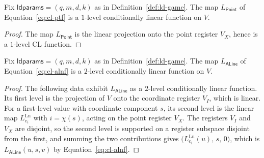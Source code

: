 \begin{lemma}\label{lem:ld-point-level}
	\leanok
	Fix $\mathsf{ldparams} = (q,m,d,k)$ as in Definition~\ref{def:ld-game}. The map $L_{\mathsf{Point}}$ of Equation~\eqref{eq:cl-ptf} is a $1$-level conditionally linear function on $V$.
\end{lemma}
\begin{proof}
	\leanok
	The map $L_{\mathsf{Point}}$ is the linear projection onto the point register $V_X$, hence is a $1$-level CL function.
\end{proof}

\begin{lemma}\label{lem:ld-aline-level}
	\leanok
	Fix $\mathsf{ldparams} = (q,m,d,k)$ as in Definition~\ref{def:ld-game}. The map $L_{\mathsf{ALine}}$ of Equation~\eqref{eq:cl-alnf} is a $2$-level conditionally linear function on $V$.
\end{lemma}
\begin{proof}
	\leanok
	The following data exhibit $L_{\mathsf{ALine}}$ as a $2$-level conditionally linear function. Its first level is the projection of $V$ onto the coordinate register $V_I$, which is linear. For a first-level value with coordinate component $s$, its second level is the linear map $L^{\mathrm{Ln}}_{e_i}$ with $i = \chi(s)$, acting on the point register $V_X$. The registers $V_I$ and $V_X$ are disjoint, so the second level is supported on a register subspace disjoint from the first, and summing the two contributions gives $\bigl(L^{\mathrm{Ln}}_{e_i}(u),\, s,\, 0\bigr)$, which is $L_{\mathsf{ALine}}(u,s,v)$ by Equation~\eqref{eq:cl-alnf}.
\end{proof}

